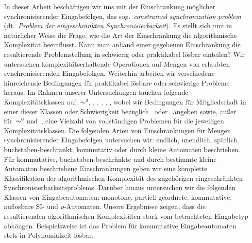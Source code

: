 In dieser Arbeit beschäftigen wir uns mit der Einschränkung 
möglicher synchronisierender Eingabefolgen, das sog.~\emph{constrained synchronization problem} (dt.~\emph{Problem der eingeschränkten Synchronisierbarkeit}).
Es stellt sich nun in natürlicher Weise die Frage, wie die Art der Einschränkung 
die algorithmische Komplexität be\-einflusst. Kann man anhand einer gegebenen Einschränkung
die resultierende Problemstellung in schwierig oder praktikabel lösbar einteilen?
Wir untersuchen komplexitätserhaltende Operationen auf Mengen von erlaubten synchronisierenden Eingabefolgen. Weiterhin
arbeiten wir verschiedene hinreichende Bedingungen  für 
praktikabel lösbare oder schwierige Probleme heraus.
Im Rahmen unserer Untersuchungen tauchen folgende Komplexitätsklassen auf: 
$\AC^0$, \LOGSPACE, \NL, \PTIME, \NP, \PSPACE,
wobei wir Bedingungen für Mitgliedschaft in einer dieser Klassen
oder Schwierigkeit bezüglich \NP\ oder \PSPACE\ 
angeben sowie, außer für~$\AC^0$ und~\PTIME, 
eine Vielzahl von 
vollständigen Problemen für die jeweiligen Komplexitätsklassen.
Die folgenden Arten von Einschränkungen für Mengen synchronisierender Eingabefolgen untersuchen wir: 
endlich, unendlich, spärlich, buchstaben-beschränkt, kommutativ oder durch kleine Automaten beschrieben.
Für kommutative, buchstaben-beschränkte und durch bestimmte kleine Automaton
beschriebene Einschränkungen  
geben wir eine komplette Klassifikation der algorithmischen Komplexität des zugehörigen eingeschränkten Synchronisierbarkeitsproblems. 
Darüber hinaus untersuchen wir die folgenden Klassen von Eingabeautomaten: monotone, partiell geordnete,
kommutative, auflösbare SI- und $\rho$-Automaten.
Unsere Ergebnisse zeigen, dass die resultierenden algorithmischen Komplexitäten
stark vom betrachteten Eingabetyp abhängen. Bei\-spiels\-wei\-se ist das Problem
für kommutative Eingabeautomaten stets in Polynomialzeit  lösbar.

